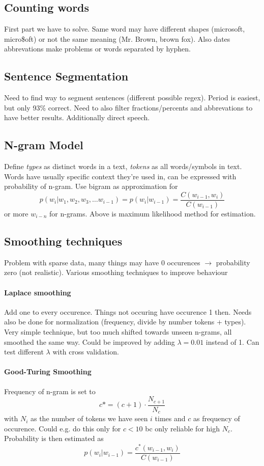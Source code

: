\documentclass[11pt]{article}
\begin{document}
\subsection{Counting words}
First part we have to solve. Same word may have different shapes (microsoft, micro\$oft) or
not the same meaning (Mr. Brown, brown fox). Also dates abbrevations make problems or words 
separated by hyphen. 

\subsection{Sentence Segmentation}
Need to find way to segment sentences (different possible regex). Period is easiest, but only 93\% correct. 
Need to also filter fractions/percents and abbrevations to have better results. Additionally direct speech.

\subsection{N-gram Model}
Define \emph{types} as distinct words in a text, \emph{tokens} as all words/symbols in text. 
Words have usually specific context they're used in, can be expressed with probability of n-gram.
Use bigram as approximation for
\begin{equation}
	p(w_i | w_1, w_2, w_3, \ldots w_{i-1}) = p(w_i | w_{i-1}) = \frac{C(w_{i-1}, w_i)}{C(w_{i-1})}
\end{equation}
or more $w_{i-n}$ for n-grams. Above is maximum likelihood method for estimation.

\subsection{Smoothing techniques}
Problem with sparse data, many things may have 0 occurences $\rightarrow$ probability zero (not realistic). 
Various smoothing techniques to improve behaviour
\paragraph{Laplace smoothing}
Add one to every occurence. Things not occuring have occurence 1 then. Needs also
be done for normalization (frequency, divide by number tokens + types).
Very simple technique, but too much shifted towards unseen n-grams, all smoothed the same way. 
Could be improved by adding $\lambda = 0.01$ instead of 1. Can test different $\lambda$ with cross
validation.

\paragraph{Good-Turing Smoothing}
Frequency of n-gram is set to
\begin{equation}
	c* = (c + 1) \cdot \frac{N_{c+1}}{N_c}
\end{equation}
with $N_i$ as the number of tokens we have seen $i$ times and $c$ as frequency of occurence. 
Could e.g. do this only for $c < 10$ bc only reliable for high $N_c$. Probability is then estimated as
\begin{equation}
	 p(w_i | w_{i-1}) = \frac{c^*(w_{i-1}, w_i)}{C(w_{i-1})}
\end{equation}
\end{document}
